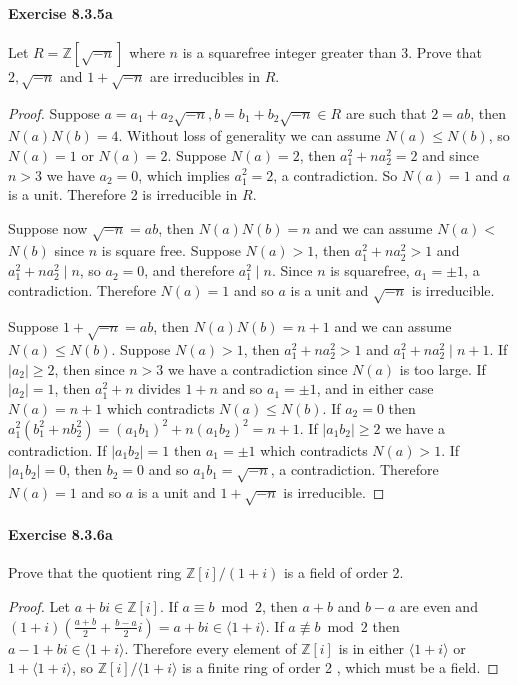 \documentclass{article}
\theoremstyle{definition}
\begin{document}
\paragraph{Exercise 8.3.5a} Let $R=\mathbb{Z}[\sqrt{-n}]$ where $n$ is a squarefree integer greater than 3. Prove that $2, \sqrt{-n}$ and $1+\sqrt{-n}$ are irreducibles in $R$.
\begin{proof}
    Suppose $a=a_1+a_2 \sqrt{-n}, b=b_1+b_2 \sqrt{-n} \in R$ are such that $2=a b$, then $N(a) N(b)=4$. Without loss of generality we can assume $N(a) \leq N(b)$, so $N(a)=1$ or $N(a)=2$. Suppose $N(a)=2$, then $a_1^2+n a_2^2=2$ and since $n>3$ we have $a_2=0$, which implies $a_1^2=2$, a contradiction. So $N(a)=1$ and $a$ is a unit. Therefore 2 is irreducible in $R$.

Suppose now $\sqrt{-n}=a b$, then $N(a) N(b)=n$ and we can assume $N(a)<$ $N(b)$ since $n$ is square free. Suppose $N(a)>1$, then $a_1^2+n a_2^2>1$ and $a_1^2+n a_2^2 \mid n$, so $a_2=0$, and therefore $a_1^2 \mid n$. Since $n$ is squarefree, $a_1=\pm 1$, a contradiction. Therefore $N(a)=1$ and so $a$ is a unit and $\sqrt{-n}$ is irreducible.

Suppose $1+\sqrt{-n}=a b$, then $N(a) N(b)=n+1$ and we can assume $N(a) \leq N(b)$. Suppose $N(a)>1$, then $a_1^2+n a_2^2>1$ and $a_1^2+n a_2^2 \mid n+1$. If $\left|a_2\right| \geq 2$, then since $n>3$ we have a contradiction since $N(a)$ is too large. If $\left|a_2\right|=1$, then $a_1^2+n$ divides $1+n$ and so $a_1=\pm 1$, and in either case $N(a)=n+1$ which contradicts $N(a) \leq N(b)$. If $a_2=0$ then $a_1^2\left(b_1^2+n b_2^2\right)=\left(a_1 b_1\right)^2+n\left(a_1 b_2\right)^2=n+1$. If $\left|a_1 b_2\right| \geq 2$ we have a contradiction. If $\left|a_1 b_2\right|=1$ then $a_1=\pm 1$ which contradicts $N(a)>1$. If $\left|a_1 b_2\right|=0$, then $b_2=0$ and so $a_1 b_1=\sqrt{-n}$, a contradiction. Therefore $N(a)=1$ and so $a$ is a unit and $1+\sqrt{-n}$ is irreducible.
\end{proof}



\paragraph{Exercise 8.3.6a} Prove that the quotient ring $\mathbb{Z}[i] /(1+i)$ is a field of order 2.
\begin{proof}
    Let $a+b i \in \mathbb{Z}[i]$. If $a \equiv b \bmod 2$, then $a+b$ and $b-a$ are even and $(1+i)\left(\frac{a+b}{2}+\frac{b-a}{2} i\right)=a+b i \in\langle 1+i\rangle$. If $a \not \equiv b \bmod 2$ then $a-1+b i \in\langle 1+i\rangle$. Therefore every element of $\mathbb{Z}[i]$ is in either $\langle 1+i\rangle$ or $1+\langle 1+i\rangle$, so $\mathbb{Z}[i] /\langle 1+i\rangle$ is a finite ring of order 2 , which must be a field.
\end{proof}
\end{document}
